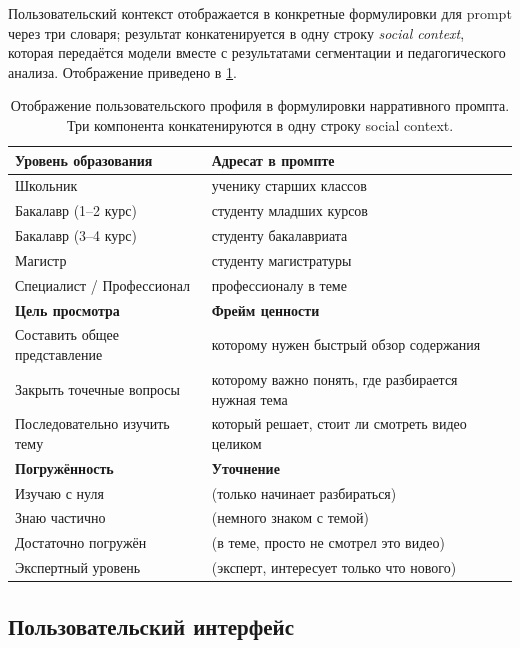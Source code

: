 Пользовательский контекст отображается в конкретные формулировки для prompt
через три словаря; результат конкатенируется в одну строку \textit{social context},
которая передаётся модели вместе с результатами сегментации и педагогического анализа.
Отображение приведено в \cref{tab:narrative-social-context}.

\begin{table}[h]
\centering
\small
\begin{tabular}{ll}
\toprule
\textbf{Уровень образования} & \textbf{Адресат в промпте} \\
\midrule
Школьник                  & ученику старших классов \\
Бакалавр (1–2 курс)       & студенту младших курсов \\
Бакалавр (3–4 курс)       & студенту бакалавриата \\
Магистр                   & студенту магистратуры \\
Специалист / Профессионал & профессионалу в теме \\
\midrule
\textbf{Цель просмотра} & \textbf{Фрейм ценности} \\
\midrule
Составить общее представление & которому нужен быстрый обзор содержания \\
Закрыть точечные вопросы      & которому важно понять, где разбирается нужная тема \\
Последовательно изучить тему  & который решает, стоит ли смотреть видео целиком \\
\midrule
\textbf{Погружённость} & \textbf{Уточнение} \\
\midrule
Изучаю с нуля        & (только начинает разбираться) \\
Знаю частично        & (немного знаком с темой) \\
Достаточно погружён  & (в теме, просто не смотрел это видео) \\
Экспертный уровень   & (эксперт, интересует только что нового) \\
\bottomrule
\end{tabular}
\caption{Отображение пользовательского профиля в формулировки нарративного промпта.
Три компонента конкатенируются в одну строку social context.}
\label{tab:narrative-social-context}
\end{table}

\subsection{Пользовательский интерфейс}
\label{subsec:ui}

